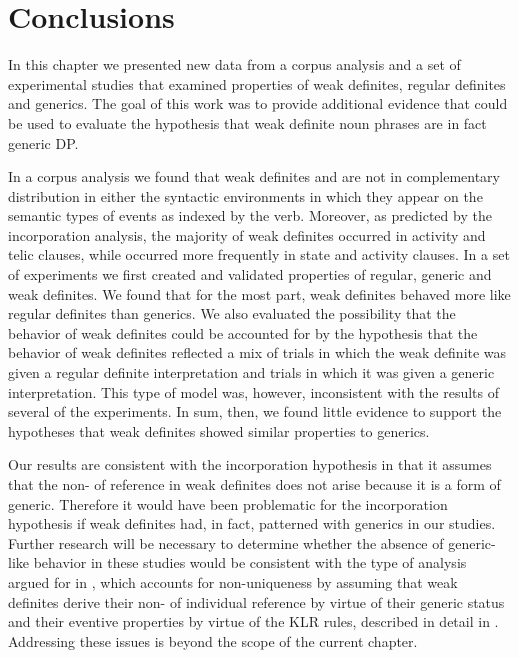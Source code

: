 \documentclass[output=paper,
modfonts
]{langscibook}
\begin{document}
\section{Conclusions} \label{sec:desaetal:5}

In this chapter we presented new data from a corpus analysis and a set of experimental studies that examined properties of weak definites, regular definites and generics. The goal of this work was to provide additional evidence that could be used to evaluate the hypothesis that weak definite noun phrases are in fact generic DP. 

In a corpus analysis we found that weak definites and  are not in complementary distribution in either the syntactic environments in which they appear on the semantic types of events as indexed by the verb.  Moreover, as predicted by the incorporation analysis, the majority of weak definites occurred in activity and telic clauses, while  occurred more frequently in state and activity clauses. In a set of experiments we first created and validated properties of regular, generic and weak definites. We found that for the most part, weak definites behaved more like regular definites than generics. We also evaluated the possibility that the behavior of weak definites could be accounted for by the hypothesis that the behavior of weak definites reflected a mix of trials in which the weak definite was given a regular definite interpretation and trials in which it was given a generic interpretation. This type of model was, however, inconsistent with the results of several of the experiments. In sum, then, we found little evidence to support the hypotheses that weak definites showed similar properties to generics.

Our results are consistent with the incorporation hypothesis in that it assumes that the non- of reference in weak definites does not arise because it is a form of generic.  Therefore it would have been problematic for the incorporation hypothesis if weak definites had, in fact, patterned with generics in our studies. Further research will be necessary to determine whether the absence of generic-like behavior in these studies would be consistent with the type of analysis argued for in \citet{Aguilar-Guevara2014}, which accounts for non-uniqueness by assuming that weak definites derive their non- of individual reference by virtue of their generic status and their eventive properties by virtue of the KLR rules, described in detail in \citet{Aguilar-Guevara2014}.  Addressing these issues is beyond the scope of the current chapter.
\end{document}
